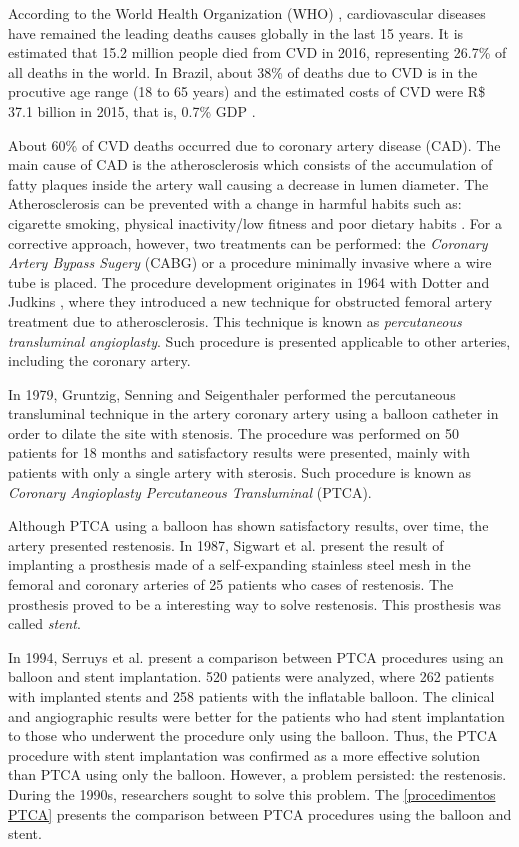 According to the World Health Organization (WHO) \cite{oms2018},
cardiovascular diseases have remained the leading
deaths causes globally in the last 15 years. 
It is estimated that 15.2 million people died from CVD in 2016,
representing 26.7\% of all deaths in the world. 
In Brazil, about 38\% of deaths due to CVD is in the procutive age range
(18 to 65 years) and the estimated
costs of CVD were R\$ 37.1 billion
in 2015, that is, 0.7\% GDP \cite{siqueira2017}.

\medskip
About 60\% of CVD deaths
occurred due to coronary artery disease (CAD).
The main cause of CAD is the atherosclerosis which consists of
the accumulation of fatty plaques inside the artery wall causing
a decrease in lumen diameter.
The Atherosclerosis can be prevented with a change in harmful habits
such as: cigarette smoking, physical inactivity/low fitness and poor dietary habits \cite{spring2013}.
For a corrective approach, however, two treatments can be performed:
the \textit{Coronary Artery Bypass Sugery} (CABG) or a 
procedure minimally invasive where a wire tube is placed.
The procedure development 
originates in 1964 with Dotter and Judkins \cite{dotter1964}, where they
introduced a new technique for obstructed femoral artery treatment
 due to atherosclerosis. This technique is
known as \textit{percutaneous transluminal angioplasty}.
Such procedure is presented applicable to
 other arteries, including the coronary artery.


\medskip
In 1979, Gruntzig, Senning and Seigenthaler \cite{gruntzig1979}
 performed the percutaneous transluminal technique in the artery
coronary artery using a balloon catheter in order to dilate the site
with stenosis. 
The procedure was performed on 50 patients for 18 months and
satisfactory results were presented, mainly with patients with only
a single artery with sterosis. 
Such procedure is known as \textit{Coronary Angioplasty
Percutaneous Transluminal} (PTCA).

\medskip
Although PTCA using a balloon has shown satisfactory results,
over time, the artery presented restenosis. 
In 1987, Sigwart et al. \cite{sigwart1987}
present the result of implanting a prosthesis made of a 
self-expanding stainless steel mesh in the femoral and 
coronary arteries of 25 patients who cases of restenosis. 
The prosthesis proved to be a
interesting way to solve restenosis. 
This prosthesis was called \textit{stent}.


\medskip
In 1994, Serruys et al. \cite{serruys1994} present a comparison between PTCA procedures
using an balloon and stent implantation. 520 patients were analyzed,
where 262 patients with implanted stents and 258 patients with the
inflatable balloon. The clinical and angiographic results were better for the patients who had stent implantation to those who underwent the procedure only
using the balloon. Thus, the PTCA procedure with stent implantation
was confirmed as a more effective solution than PTCA using only the balloon.
However, a problem persisted: the restenosis. 
During the 1990s, researchers
sought to solve this problem. The \ref{procedimentos PTCA} presents the comparison between
PTCA procedures using the balloon and stent.

